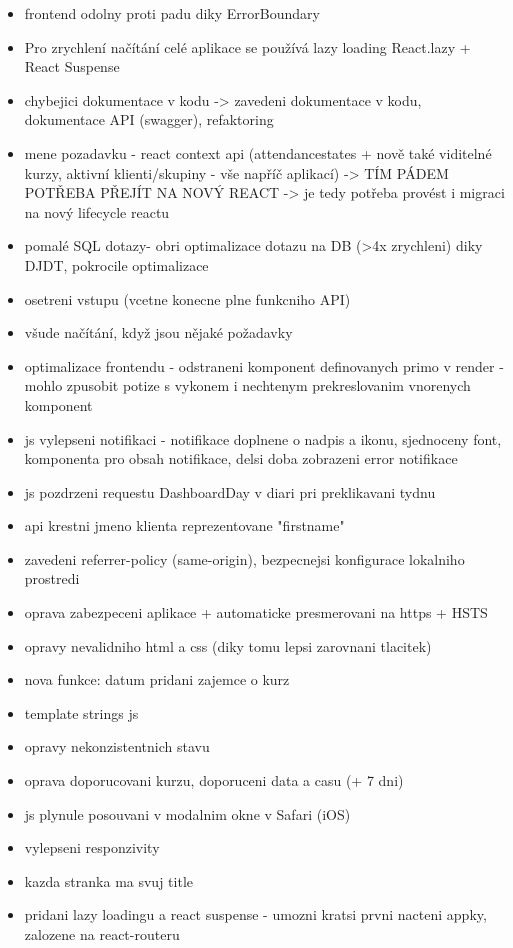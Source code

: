 \begin{itemize}
\item frontend odolny proti padu diky ErrorBoundary
\item Pro zrychlení načítání celé aplikace se používá lazy loading React.lazy + React Suspense
\item chybejici dokumentace v kodu -> zavedeni dokumentace v kodu, dokumentace API (swagger), refaktoring
\item mene pozadavku - react context api (attendancestates + nově také viditelné kurzy, aktivní klienti/skupiny - vše napříč aplikací) -> TÍM PÁDEM POTŘEBA PŘEJÍT NA NOVÝ REACT -> je tedy potřeba provést i migraci na nový lifecycle reactu
\item pomalé SQL dotazy- obri optimalizace dotazu na DB (>4x zrychleni) diky DJDT, pokrocile optimalizace
\item osetreni vstupu (vcetne konecne plne funkcniho API)
\item všude načítání, když jsou nějaké požadavky
\item optimalizace frontendu - odstraneni komponent definovanych primo v render - mohlo zpusobit potize s vykonem i nechtenym prekreslovanim vnorenych komponent
\item js vylepseni notifikaci - notifikace doplnene o nadpis a ikonu, sjednoceny font, komponenta pro obsah notifikace, delsi doba zobrazeni error notifikace
\item js pozdrzeni requestu DashboardDay v diari pri preklikavani tydnu 
\item api krestni jmeno klienta reprezentovane "firstname"
\item zavedeni referrer-policy (same-origin), bezpecnejsi konfigurace lokalniho prostredi
\item oprava zabezpeceni aplikace + automaticke presmerovani na https + HSTS
\item opravy nevalidniho html a css (diky tomu lepsi zarovnani tlacitek)
\item nova funkce: datum pridani zajemce o kurz
\item template strings js
\item opravy nekonzistentnich stavu
\item oprava doporucovani kurzu, doporuceni data a casu (+ 7 dni)
\item js plynule posouvani v modalnim okne v Safari (iOS)
\item vylepseni responzivity
\item kazda stranka ma svuj title
\item pridani lazy loadingu a react suspense - umozni kratsi prvni nacteni appky, zalozene na react-routeru

\end{itemize}
